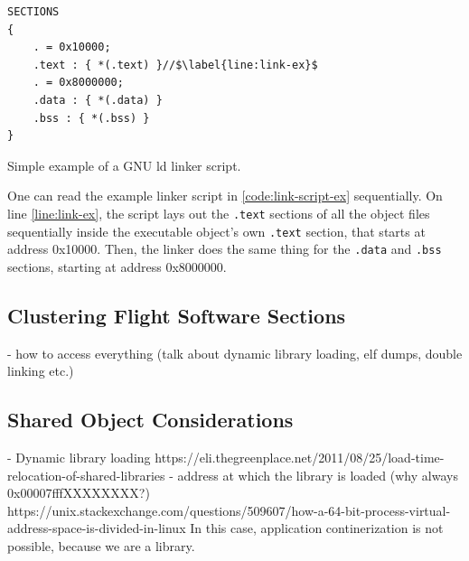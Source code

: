 {\begin{listing}[H]
	\vspace{12pt}
	\begin{verbatim}
SECTIONS
{
	. = 0x10000;
	.text : { *(.text) }//$\label{line:link-ex}$
	. = 0x8000000;
	.data : { *(.data) }
	.bss : { *(.bss) }
}
	\end{verbatim}
	\caption{Simple example of a GNU ld linker script.}
	\label{code:link-script-ex}
\end{listing}

One can read the example linker script in \autoref{code:link-script-ex}  sequentially. On line \ref{line:link-ex}, the script lays out the \texttt{.text} sections of all the object files sequentially inside the executable object's own \texttt{.text} section, that starts at address 0x10000. Then, the linker does the same thing for the \texttt{.data} and \texttt{.bss} sections, starting at address 0x8000000.

\subsection*{Clustering Flight Software Sections}

- how to access everything (talk about dynamic library loading, elf dumps, double linking etc.)

\subsection*{Shared Object Considerations}\label{sec:dynlib-considerations}
- Dynamic library loading  https://eli.thegreenplace.net/2011/08/25/load-time-relocation-of-shared-libraries
- address at which the library is loaded (why always 0x00007fffXXXXXXXX?) https://unix.stackexchange.com/questions/509607/how-a-64-bit-process-virtual-address-space-is-divided-in-linux
In this case, application continerization is not possible, because we are a library.

}